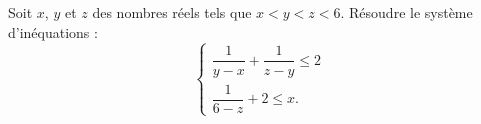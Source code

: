 \documentclass[varwidth]{standalone}
\begin{document}
    Soit $x$, $y$ et $z$ des nombres r\'eels tels que $x < y < z < 6$. R\'esoudre le syst\`eme d'in\'equations :
    \[
        \begin{cases}
            \dfrac{1}{y - x} + \dfrac{1}{z - y} \leq 2 \\
            \dfrac{1}{6 - z} + 2 \leq x.
        \end{cases}
    \]
\end{document}
